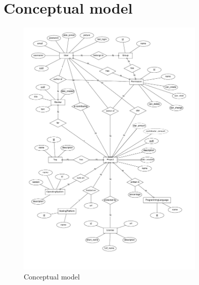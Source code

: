 \pagebreak
\section{Conceptual model}

\begin{figure}[h]
  \centering
  \includegraphics[width=0.8\textwidth]{./TeX-files/ERD/conceptual-model.pdf}
  \caption{Conceptual model}
  \label{fig:ERD}
\end{figure}

